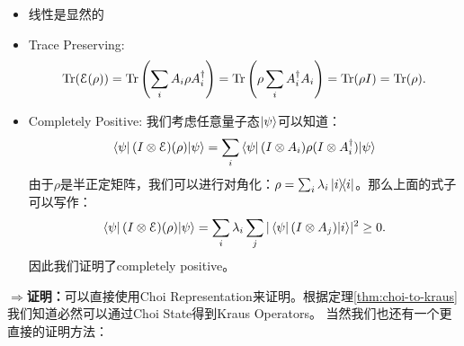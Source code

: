 \begin{itemize}
  \item 线性是显然的
    \item Trace Preserving:
      \begin{align}
        \operatorname{Tr}(\mathcal{E}(\rho)) = \operatorname{Tr}\left(\sum_i A_i \rho A_i^\dagger\right) = \operatorname{Tr}\left(\rho \sum_i A_i^\dagger A_i\right) = \operatorname{Tr}(\rho I) = \operatorname{Tr}(\rho).
      \end{align}
    \item Completely Positive: 我们考虑任意量子态$ \left| \psi \right\rangle $可以知道：
      \begin{align}\label{eq:completely-positive-proof}
        \left\langle \psi \right|(I \otimes \mathcal{E})(\rho)|\psi\rangle = \sum_i \left\langle \psi \right|(I \otimes A_i) \rho (I \otimes A_i^\dagger)|\psi\rangle  
      \end{align}
      由于$ \rho $是半正定矩阵，我们可以进行对角化：$ \rho = \sum_i \lambda_i \left| i \middle\rangle\!\middle\langle i \right| $。那么上面的式子可以写作：
      \begin{align}
        \left\langle \psi \right|(I \otimes \mathcal{E})(\rho)|\psi\rangle = \sum_i \lambda_i \sum_j |\left\langle \psi \right|(I \otimes A_j)|i\rangle|^2 \geq0.
      \end{align}
      因此我们证明了completely positive。
\end{itemize}

\textbf{$ \Rightarrow $证明：}可以直接使用Choi Representation来证明。根据定理\cref{thm:choi-to-kraus}我们知道必然可以通过Choi State得到Kraus Operators。
当然我们也还有一个更直接的证明方法：

